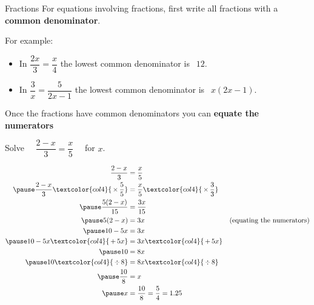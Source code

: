 \documentclass[aspectratio=169,10pt]{beamer}
\begin{document}
\begin{frame}{Fractions}
  For equations involving fractions, first write all fractions with a \textbf{common denominator}.\pause
  
  For example:
    \begin{itemize}
      \item In $\dfrac{2x}{3}=\dfrac{x}{4}$ the lowest common denominator is \pause $\ \ 12$.
      \item In $\dfrac{3}{x}=\dfrac{5}{2x-1}$ the lowest common denominator is \pause $\ \ x(2x-1)$.
    \end{itemize}
  Once the fractions have common denominators you can \textbf{equate the numerators}
\end{frame}

\begin{frame}
\small
  \begin{example}
    Solve $\quad\dfrac{2-x}{3}=\dfrac{x}{5}\quad$ for $x$.
  \end{example}
  \begin{solution}[]\vspace{-2em}
    \[
      \begin{aligned}
         \frac{2-x}{3}&=\frac{x}{5}\\\pause
         \frac{2-x}{3}\textcolor{col4}{\,\times\,\frac{5}{5}}&=\frac{x}{5}\textcolor{col4}{\,\times\,\frac{3}{3}}\\\pause
         \frac{5(2-x)}{15}&=\frac{3x}{15}\\\pause
         5(2-x)&=3x&\text{(equating the numerators)}\\\pause
         10-5x&=3x\\\pause
         10-5x\textcolor{col4}{\,+\,5x}&=3x\textcolor{col4}{\,+\,5x}\\\pause
         10&=8x\\\pause
         10\textcolor{col4}{\,\div\,8}&=8x\textcolor{col4}{\,\div\,8}\\\pause
         \frac{10}{8}&=x\\\pause
         x&=\frac{10}{8}=\frac{5}{4}=1.25
      \end{aligned}
      \]
  \end{solution}
\end{frame}
\end{document}
